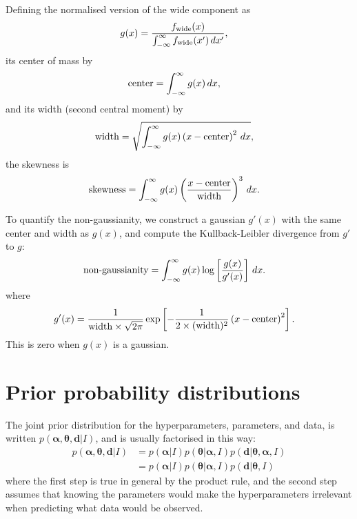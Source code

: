 \documentclass[a4paper, 12pt]{article}
\newcommand{\hypers}{\boldsymbol{\alpha}}
\newcommand{\params}{\boldsymbol{\theta}}
\newcommand{\data}{\boldsymbol{d}}
\newcommand{\info}{I}
\newcommand{\x}{x}
\begin{document}
Defining the normalised version of the wide component as
\begin{align}
g(\x) &= \frac{f_{\rm wide}(\x)}
             {\int_{-\infty}^\infty f_{\rm wide}(\x') \, d\x'},
\end{align}
its center of mass by
\begin{align}
\textnormal{center} &= \int_{-\infty}^\infty g(\x) \, d\x,
\end{align}
and its width (second central moment) by
\begin{align}
\textnormal{width} &= \sqrt{\int_{-\infty}^\infty
                            g(\x) \left(\x - \textnormal{center}\right)^2
                            \, d\x},
\end{align}
the skewness is
\begin{align}
\textnormal{skewness} &= \int_{-\infty}^\infty
                           g(\x) 
                           \left(
                             \frac{x - \textnormal{center}}{\textnormal{width}}
                           \right)^3
                         \, d\x.
\end{align}

To quantify the non-gaussianity, we construct a gaussian
$g'(\x)$
with the same center and width as $g(\x)$, and compute the
Kullback-Leibler divergence from $g'$ to $g$:
\begin{align}
\textnormal{non-gaussianity} &= 
    \int_{-\infty}^\infty g(\x) \log\left[\frac{g(\x)}{g'(\x)}\right] \, d\x.
\end{align}
where
\begin{align}
g'(\x) &= \frac{1}{\textnormal{width} \times \sqrt{2\pi}}
            \exp\left[-\frac{1}{2\times (\textnormal{width})^2}
                    \left(\x - \textnormal{center}\right)^2\right].
\end{align}
This is zero when $g(\x)$ is a gaussian.

\section{Prior probability distributions}\label{sec:priors}
The joint prior distribution for the hyperparameters, parameters, and data,
is written $p(\hypers, \params, \data | \info)$, and is usually factorised
in this way:
\begin{align}
p(\hypers, \params, \data | \info) &=
    p(\hypers | \info)p(\params | \hypers, \info)
    p(\data | \params, \hypers, \info)\\
    &= p(\hypers | \info)p(\params | \hypers, \info)
    p(\data | \params, \info)
\end{align}
where the first step is true in general by the product rule, and the second
step assumes that knowing the parameters would make the hyperparameters
irrelevant when predicting what data would be observed.
\end{document}
